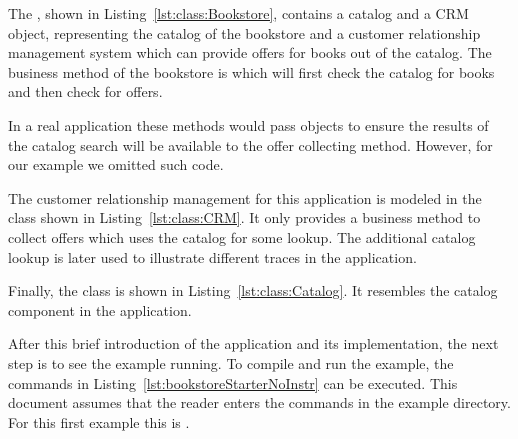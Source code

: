 \pagebreak

\noindent The , shown in Listing~\ref{lst:class:Bookstore}, contains a catalog and a CRM object, representing the catalog of the bookstore and a customer relationship management system which can provide offers for books out of the catalog. The business method of the bookstore is  which will first check the catalog for books and then check for offers.

In a real application these methods would pass objects to ensure the results of the catalog search will be available to the offer collecting method. However, for our example we omitted such code.



\noindent The customer relationship management for this application is modeled in the  class shown in Listing~\ref{lst:class:CRM}. It only provides a business method to collect offers which uses the catalog for some lookup. The additional catalog lookup is later used to illustrate different traces in the application.




\enlargethispage{0.8cm}

\noindent Finally, the class  is shown in Listing~\ref{lst:class:Catalog}. It resembles the catalog component in the application.



\noindent After this brief introduction of the application and its implementation, the next step is to see the example running. To compile and run the example, the commands in Listing~\ref{lst:bookstoreStarterNoInstr} can be executed. This document assumes that the reader enters the commands in the example directory. For this first example this is .
\\

